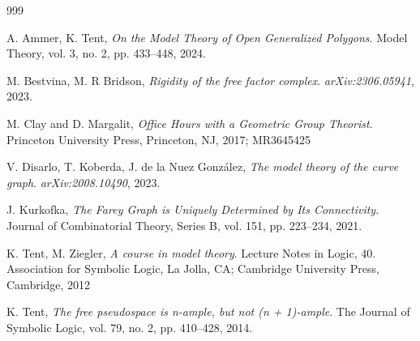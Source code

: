 \begin{thebibliography}{999}

 
  A. Ammer, K. Tent, \emph{On the Model Theory of Open Generalized Polygons}. Model Theory, vol. 3, no. 2, pp. 433--448, 2024. 


 M. Bestvina, M. R Bridson, \emph{Rigidity of the free factor complex}. \textit{arXiv:2306.05941}, 2023. 

 M. Clay and D. Margalit, \emph{Office Hours with a Geometric Group Theorist}. Princeton University Press, Princeton, NJ, 2017; MR3645425


 V. Disarlo, T. Koberda, J. de la Nuez González, \emph{The model theory of the curve graph}. \textit{arXiv:2008.10490}, 2023.

J. Kurkofka, 
\emph{The Farey Graph is Uniquely Determined by Its Connectivity}. 
Journal of Combinatorial Theory, Series B, 
vol. 151, pp. 223–234, 2021. 

 K. Tent, M. Ziegler, \emph{A course in model theory}. Lecture Notes in Logic, 40. Association for Symbolic Logic, La Jolla, CA; Cambridge University Press, Cambridge, 2012
		
 K. Tent, \emph{The free pseudospace is n-ample, but not (n + 1)-ample}. The Journal of Symbolic Logic, 
vol. 79, no. 2, pp. 410–428, 2014. 

\end{thebibliography}
